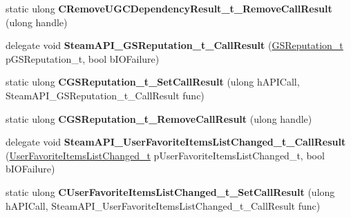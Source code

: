\begin{DoxyCompactItemize}
\item 
\mbox{\label{class_valve_1_1_interop_1_1_native_entrypoints_a1a8955958740e03eeb9ed668fbf5b89a}} 
static ulong {\bfseries C\+Remove\+U\+G\+C\+Dependency\+Result\+\_\+t\+\_\+\+Remove\+Call\+Result} (ulong handle)
\item 
\mbox{\label{class_valve_1_1_interop_1_1_native_entrypoints_a3a965e82d38da85033efed80261d0a5a}} 
delegate void {\bfseries Steam\+A\+P\+I\+\_\+\+G\+S\+Reputation\+\_\+t\+\_\+\+Call\+Result} (\hyperlink{struct_valve_1_1_steamworks_1_1_g_s_reputation__t}{G\+S\+Reputation\+\_\+t} p\+G\+S\+Reputation\+\_\+t, bool b\+I\+O\+Failure)
\item 
\mbox{\label{class_valve_1_1_interop_1_1_native_entrypoints_a78f58e498a5d5de5347d935921002f8a}} 
static ulong {\bfseries C\+G\+S\+Reputation\+\_\+t\+\_\+\+Set\+Call\+Result} (ulong h\+A\+P\+I\+Call, Steam\+A\+P\+I\+\_\+\+G\+S\+Reputation\+\_\+t\+\_\+\+Call\+Result func)
\item 
\mbox{\label{class_valve_1_1_interop_1_1_native_entrypoints_a271596026869a7ebb1ba87f705964d69}} 
static ulong {\bfseries C\+G\+S\+Reputation\+\_\+t\+\_\+\+Remove\+Call\+Result} (ulong handle)
\item 
\mbox{\label{class_valve_1_1_interop_1_1_native_entrypoints_ae8c4eaf9ad2790dae5b8a14d4a118c6e}} 
delegate void {\bfseries Steam\+A\+P\+I\+\_\+\+User\+Favorite\+Items\+List\+Changed\+\_\+t\+\_\+\+Call\+Result} (\hyperlink{struct_valve_1_1_steamworks_1_1_user_favorite_items_list_changed__t}{User\+Favorite\+Items\+List\+Changed\+\_\+t} p\+User\+Favorite\+Items\+List\+Changed\+\_\+t, bool b\+I\+O\+Failure)
\item 
\mbox{\label{class_valve_1_1_interop_1_1_native_entrypoints_a82f2fbe5e5889802dfa07db830134c16}} 
static ulong {\bfseries C\+User\+Favorite\+Items\+List\+Changed\+\_\+t\+\_\+\+Set\+Call\+Result} (ulong h\+A\+P\+I\+Call, Steam\+A\+P\+I\+\_\+\+User\+Favorite\+Items\+List\+Changed\+\_\+t\+\_\+\+Call\+Result func)
\item 

\end{DoxyCompactItemize}
